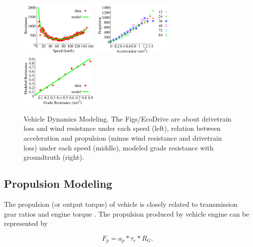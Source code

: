 \begin{figure}[t]
\begin{center}
\includegraphics[width=1.5in,angle=0]{Figs/EcoDrive/lei_loss.pdf}
\hspace{-0.0cm}
\includegraphics[width=1.5in,angle=0]{Figs/EcoDrive/lei_torque.pdf}
\hspace{-0.0cm}
\includegraphics[width=1.5in,angle=0]{Figs/EcoDrive/lei_slope.pdf}
\hspace{-0.0cm}
\vspace{-0.2cm}
\caption{Vehicle Dynamics Modeling. The Figs/EcoDrive are about drivetrain loss and wind resistance under each speed (left), 
relation between acceleration and propulsion (minus wind resistance and drivetrain loss) under each speed (middle), 
modeled grade resistance with groundtruth (right).}
\vspace{-0.8cm}
\label{modeling}
\end{center}
\end{figure}

\subsection{Propulsion Modeling}


The propulsion (or output torque) of vehicle is closely related
to transmission gear ratios and engine torque \cite{vong2006prediction, giannelli2005heavy}. 
The propulsion produced by vehicle engine
can be represented by

\begin{equation}
 F_p = a_p * \tau_e * R_G.
\end{equation}

